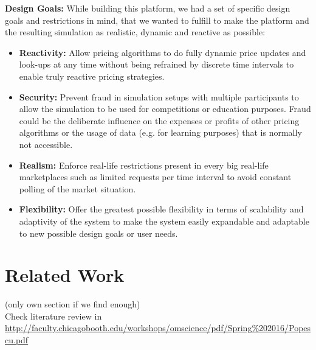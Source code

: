 \textbf{Design Goals:} While building this platform, we had a set of specific design goals and restrictions in mind, that we wanted to fulfill to make the platform and the resulting simulation as realistic, dynamic and reactive as possible: 
\begin{itemize}
    \item \textbf{Reactivity:} Allow pricing algorithms to do fully dynamic price updates and look-ups at any time without being refrained by discrete time intervals to enable truly reactive pricing strategies.
    \item \textbf{Security:} Prevent fraud in simulation setups with multiple participants to allow the simulation to be used for competitions or education purposes. Fraud could be the deliberate influence on the expenses or profits of other pricing algorithms or the usage of data (e.g. for learning purposes) that is normally not accessible.
    \item \textbf{Realism:} Enforce real-life restrictions present in every big real-life marketplaces such as limited requests per time interval to avoid constant polling of the market situation.  
    \item \textbf{Flexibility:} Offer the greatest possible flexibility in terms of scalability and adaptivity of the system to make the system easily expandable and adaptable to new possible design goals or user needs.
\end{itemize}


%
\section{Related Work}
%
(only own section if we find enough) \\

Check literature review in \url{http://faculty.chicagobooth.edu/workshops/omscience/pdf/Spring%202016/Popescu.pdf}